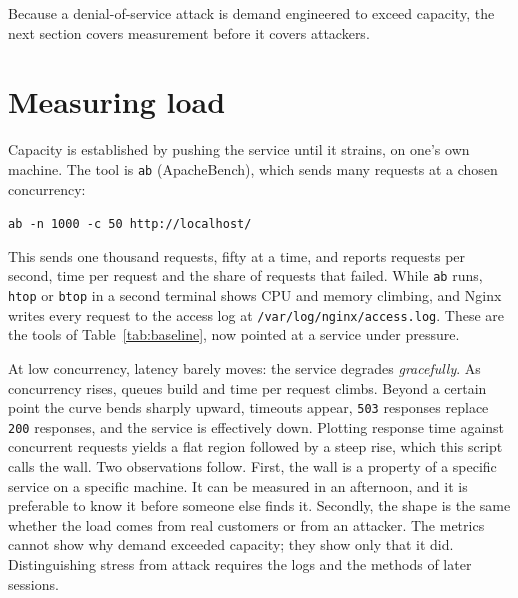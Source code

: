 Because a denial-of-service attack is demand engineered to exceed capacity,
the next section covers measurement before it covers attackers.

\section{Measuring load}

Capacity is established by pushing the service until it strains, on one's
own machine. The tool is \texttt{ab} (ApacheBench), which sends many requests
at a chosen concurrency:
\begin{center}
\texttt{ab -n 1000 -c 50 http://localhost/}
\end{center}
\noindent
This sends one thousand requests, fifty at a time, and reports requests per
second, time per request and the share of requests that failed. While
\texttt{ab} runs, \texttt{htop} or \texttt{btop} in a second terminal shows
CPU and memory climbing, and Nginx writes every request to the access log at
\texttt{/var/log/nginx/access.log}. These are the tools of
Table~\ref{tab:baseline}, now pointed at a service under pressure.

\begin{example}\label{ex:thewall}
At low concurrency, latency barely moves: the service degrades
\emph{gracefully}. As concurrency rises, queues build and time per request
climbs. Beyond a certain point the curve bends sharply upward, timeouts
appear, \texttt{503} responses replace \texttt{200} responses, and the service
is effectively down. Plotting response time against concurrent requests yields
a flat region followed by a steep rise, which this script calls the wall. Two
observations follow. First, the wall is a property of a specific service on a
specific machine. It can be measured in an afternoon, and it is preferable to
know it before someone else finds it. Secondly, the shape is the same whether
the load comes from real customers or from an attacker. The metrics cannot
show why demand exceeded capacity; they show only that it did. Distinguishing
stress from attack requires the logs and the methods of later sessions.
\end{example}

